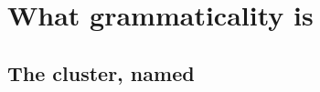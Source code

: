 \chapter{What grammaticality is}
\label{ch:what-grammaticality-is}

%
%

\section{The cluster, named}

%
%
%


